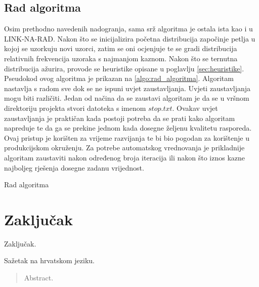 \documentclass[times, utf8, zavrsni]{fer}
\begin{document}
\section{Rad algoritma}
Osim prethodno navedenih nadogranja, sama srž algoritma je ostala ista kao i u LINK-NA-RAD. Nakon što se inicijalizira početna
distribucija započinje petlja u kojoj se uzorkuju novi uzorci, zatim se oni ocjenjuje te se gradi distribucija relativnih
frekvencija uzoraka s najmanjom kaznom. Nakon što se ternutna distribucija ažurira, provode se heuristike opisane u poglavlju
\ref{sec:heuristike}. Pseudokod ovog algoritma je prikazan na \ref{algo:rad_algoritma}. Algoritam nastavlja s radom
sve dok se ne ispuni uvjet zaustavljanja. Uvjeti zaustavljanja mogu biti
različiti. Jedan od načina da se zaustavi algoritam je da se u vršnom direktoriju projekta stvori datoteka s imenom
$stop.txt$. Ovakav uvjet zaustavljanja je praktičan kada postoji potreba da se prati kako algoritam napreduje te da ga se prekine
jednom kada dosegne željenu kvalitetu rasporeda. Ovaj pristup je korišten za vrijeme razvijanja te bi bio pogodan za korištenje
u produkcijskom okruženju. Za potrebe automatskog vrednovanja je prikladnije algoritam zaustaviti nakon određenog broja iteracija
ili nakon što iznos kazne najboljeg rješenja dosegne zadanu vrijednost.




\begin{algorithm}
  \caption{Rad algoritma}
  \label{algo:rad_algoritma}
  \begin{algorithmic}
  \REPEAT
  \end{algorithmic}
\end{algorithm}







\chapter{Zaključak}
Zaključak.




\begin{sazetak}
Sažetak na hrvatskom jeziku.

\end{sazetak}

\begin{abstract}
Abstract.

\end{abstract}
\end{document}
